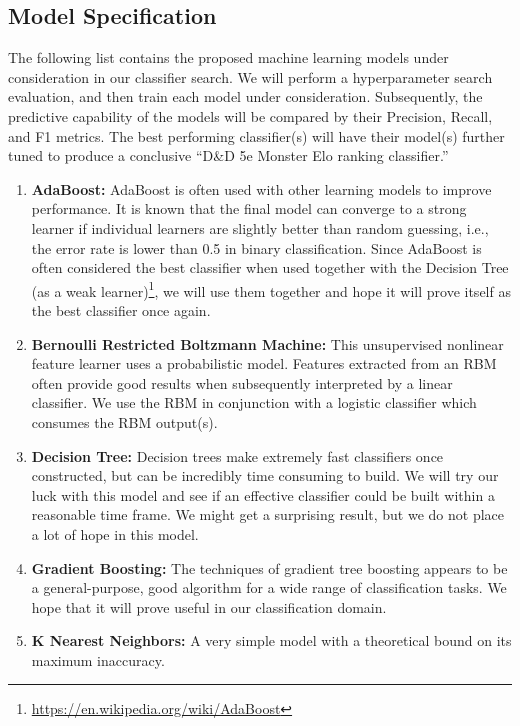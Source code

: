 \documentclass{article}
\newcommand{\DnD}{D\&D 5e\xspace}
\begin{document}
\hypertarget{model-specification}{%
\subsection{Model Specification}\label{model-specification}}
The following list contains the proposed machine learning models under consideration in our classifier search.
We will perform a hyperparameter search evaluation, and then train each model under consideration.
Subsequently, the predictive capability of the models will be compared by their Precision, Recall, and F1 metrics.
The best performing classifier(s) will have their model(s) further tuned to produce a conclusive ``\DnD Monster Elo ranking classifier.''

\begin{enumerate}
	\def\labelenumi{\arabic{enumi}.}
	\item\textbf{AdaBoost:}
	AdaBoost is often used with other learning models to improve performance.
	It is known that the final model can converge to a strong learner if individual learners are slightly better than random guessing, i.e., the error rate is lower than 0.5 in binary classification.
	Since AdaBoost is often considered the best classifier when used together with the Decision Tree (as a weak learner)\footnote{\url{https://en.wikipedia.org/wiki/AdaBoost}}, we will use them together and hope it will prove itself as the best classifier once again.
	\item\textbf{Bernoulli Restricted Boltzmann Machine:}
	This unsupervised nonlinear feature learner uses a probabilistic model.
	Features extracted from an RBM often provide good results when subsequently interpreted by a linear classifier.
	We use the RBM in conjunction with a logistic classifier which consumes the RBM output(s).
	\item\textbf{Decision Tree:}
	Decision trees make extremely fast classifiers once constructed, but can be incredibly time consuming to build.
	We will try our luck with this model and see if an effective classifier could be built within a reasonable time frame.
	We might get a surprising result, but we do not place a lot of hope in this model.
	\item\textbf{Gradient Boosting:}
	The techniques of gradient tree boosting appears to be a general-purpose, good algorithm for a wide range of classification tasks.
	We hope that it will prove useful in our classification domain.
	\item\textbf{K Nearest Neighbors:}
	A very simple model with a theoretical bound on its maximum inaccuracy.

\end{enumerate}
\end{document}
